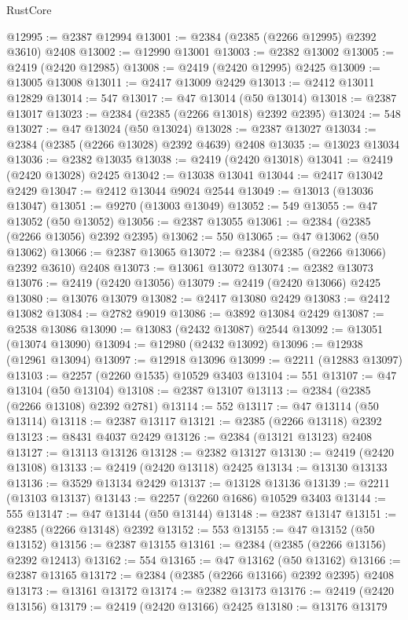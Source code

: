 \begin{lexlean}{RustCore}
\begin{coremodule}
@12995 := @2387 @12994
@13001 := @2384 (@2385 (@2266 @12995) @2392 @3610) @2408
@13002 := @12990 @13001
@13003 := @2382 @13002
@13005 := @2419 (@2420 @12985)
@13008 := @2419 (@2420 @12995) @2425
@13009 := @13005 @13008
@13011 := @2417 @13009 @2429
@13013 := @2412 @13011 @12829
@13014 := 547
@13017 := @47 @13014 (@50 @13014)
@13018 := @2387 @13017
@13023 := @2384 (@2385 (@2266 @13018) @2392 @2395)
@13024 := 548
@13027 := @47 @13024 (@50 @13024)
@13028 := @2387 @13027
@13034 := @2384 (@2385 (@2266 @13028) @2392 @4639) @2408
@13035 := @13023 @13034
@13036 := @2382 @13035
@13038 := @2419 (@2420 @13018)
@13041 := @2419 (@2420 @13028) @2425
@13042 := @13038 @13041
@13044 := @2417 @13042 @2429
@13047 := @2412 @13044 @9024 @2544
@13049 := @13013 (@13036 @13047)
@13051 := @9270 (@13003 @13049)
@13052 := 549
@13055 := @47 @13052 (@50 @13052)
@13056 := @2387 @13055
@13061 := @2384 (@2385 (@2266 @13056) @2392 @2395)
@13062 := 550
@13065 := @47 @13062 (@50 @13062)
@13066 := @2387 @13065
@13072 := @2384 (@2385 (@2266 @13066) @2392 @3610) @2408
@13073 := @13061 @13072
@13074 := @2382 @13073
@13076 := @2419 (@2420 @13056)
@13079 := @2419 (@2420 @13066) @2425
@13080 := @13076 @13079
@13082 := @2417 @13080 @2429
@13083 := @2412 @13082
@13084 := @2782 @9019
@13086 := @3892 @13084 @2429
@13087 := @2538 @13086
@13090 := @13083 (@2432 @13087) @2544
@13092 := @13051 (@13074 @13090)
@13094 := @12980 (@2432 @13092)
@13096 := @12938 (@12961 @13094)
@13097 := @12918 @13096
@13099 := @2211 (@12883 @13097)
@13103 := @2257 (@2260 @1535) @10529 @3403
@13104 := 551
@13107 := @47 @13104 (@50 @13104)
@13108 := @2387 @13107
@13113 := @2384 (@2385 (@2266 @13108) @2392 @2781)
@13114 := 552
@13117 := @47 @13114 (@50 @13114)
@13118 := @2387 @13117
@13121 := @2385 (@2266 @13118) @2392
@13123 := @8431 @4037 @2429
@13126 := @2384 (@13121 @13123) @2408
@13127 := @13113 @13126
@13128 := @2382 @13127
@13130 := @2419 (@2420 @13108)
@13133 := @2419 (@2420 @13118) @2425
@13134 := @13130 @13133
@13136 := @3529 @13134 @2429
@13137 := @13128 @13136
@13139 := @2211 (@13103 @13137)
@13143 := @2257 (@2260 @1686) @10529 @3403
@13144 := 555
@13147 := @47 @13144 (@50 @13144)
@13148 := @2387 @13147
@13151 := @2385 (@2266 @13148) @2392
@13152 := 553
@13155 := @47 @13152 (@50 @13152)
@13156 := @2387 @13155
@13161 := @2384 (@2385 (@2266 @13156) @2392 @12413)
@13162 := 554
@13165 := @47 @13162 (@50 @13162)
@13166 := @2387 @13165
@13172 := @2384 (@2385 (@2266 @13166) @2392 @2395) @2408
@13173 := @13161 @13172
@13174 := @2382 @13173
@13176 := @2419 (@2420 @13156)
@13179 := @2419 (@2420 @13166) @2425
@13180 := @13176 @13179

\end{coremodule}
\end{lexlean}
